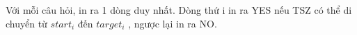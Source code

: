 Với mỗi câu hỏi, in ra 1 dòng duy nhất. Dòng thứ i in ra YES nếu TSZ có thể di chuyển từ $start_{i}$ đến $target_{i}$ , ngược lại in ra NO.